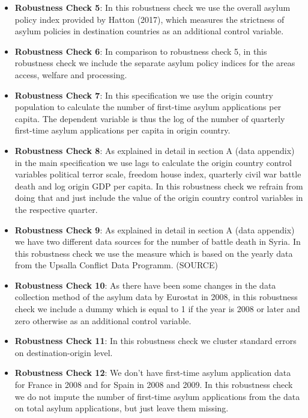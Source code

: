 \documentclass[11pt,a4paper]{scrartcl}
\begin{document}
\begin{itemize}
	\item \textbf{Robustness Check 5}: In this robustness check we use the overall asylum policy index provided by Hatton (2017), which measures the strictness of asylum policies in destination countries as an additional control variable.
	
	\item \textbf{Robustness Check 6}: In comparison to robustness check 5, in this robustness check we include the separate asylum policy indices for the areas access, welfare and processing. 
	
	\item \textbf{Robustness Check 7}: In this specification we use the origin country population to calculate the number of first-time asylum applications per capita. The dependent variable is thus the log of the number of quarterly first-time asylum applications per capita in origin country.  
	
	\item \textbf{Robustness Check 8}: As explained in detail in section A (data appendix) in the main specification we use lags to calculate the origin country control variables political terror scale, freedom house index, quarterly civil war battle death and log origin GDP per capita. In this robustness check we refrain from doing that and just include the value of the origin country control variables in the respective quarter.
	
	\item \textbf{Robustness Check 9}: As explained in detail in section A (data appendix) we have two different data sources for the number of battle death in Syria. In this robustness check we use the measure which is based on the yearly data from the Upsalla Conflict Data Programm. (SOURCE) 
	
	\item \textbf{Robustness Check 10}: As there have been some changes in the data collection method of the asylum data by Eurostat in 2008, in this robustness check we include a dummy which is equal to 1 if the year is 2008 or later and zero otherwise as an additional control variable. 
	
	\item \textbf{Robustness Check 11}: In this robustness check we cluster standard errors on destination-origin level. 
	
	\item \textbf{Robustness Check 12}: We don't have first-time asylum application data for France in 2008 and for Spain in 2008 and 2009. In this robustness check we do not impute the number of first-time asylum applications from the data on total asylum applications, but just leave them missing.   
	

\end{itemize}
\end{document}
